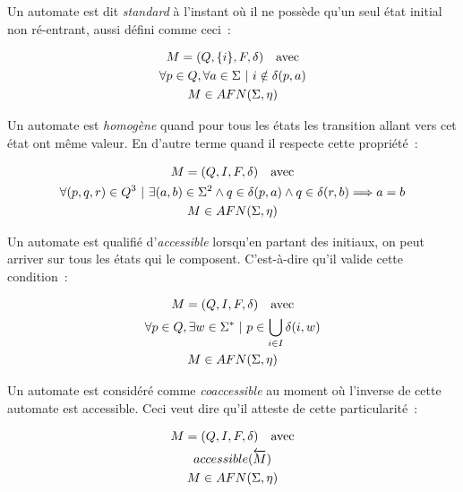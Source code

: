 \vphantom{}

\begin{definition}
    Un automate est dit \textit{standard} à l'instant où il ne possède qu'un seul
    état initial non ré-entrant, aussi défini comme ceci~:

    \begin{gather*}
        M = (Q, \{i\}, F, \delta) \quad \text{avec} \\
        \forall p \in Q, \forall a \in \Sigma ~|~ i \notin \delta(p, a) \notag \\
        M \in AFN(\Sigma, \eta) \notag
    \end{gather*}
\end{definition}

\begin{definition}
    Un automate est \textit{homogène} quand pour tous les états les transition
    allant vers cet état ont même valeur. En d'autre terme quand il respecte
    cette propriété~:

    \begin{gather*}
        M = (Q, I, F, \delta) \quad \text{avec} \\
        \forall (p, q, r) \in Q^3 ~|~ \exists (a, b) \in \Sigma^2 \land q \in \delta(p, a) \land q \in \delta(r, b) \Longrightarrow a = b \notag \\
        M \in AFN(\Sigma, \eta) \notag
    \end{gather*}
\end{definition}

\begin{definition}
    Un automate est qualifié d'\textit{accessible} lorsqu'en partant des initiaux,
    on peut arriver sur tous les états qui le composent. C'est-à-dire qu'il valide
    cette condition~:

    \begin{gather*}
        M = (Q, I, F, \delta) \quad \text{avec} \\
        \forall p \in Q, \exists w \in \Sigma^* ~|~ p \in \bigcup_{i \in I} \delta(i, w) \notag \\
        M \in AFN(\Sigma, \eta) \notag
    \end{gather*}
\end{definition}

\begin{lemma}
    Un automate est considéré comme \textit{coaccessible} au moment où l'inverse de
    cette automate est accessible. Ceci veut dire qu'il atteste de cette
    particularité~:

    \begin{gather*}
        M = (Q, I, F, \delta) \quad \text{avec} \\
        accessible(\overleftarrow{M}) \notag \\
        M \in AFN(\Sigma, \eta) \notag
    \end{gather*}
\end{lemma}

